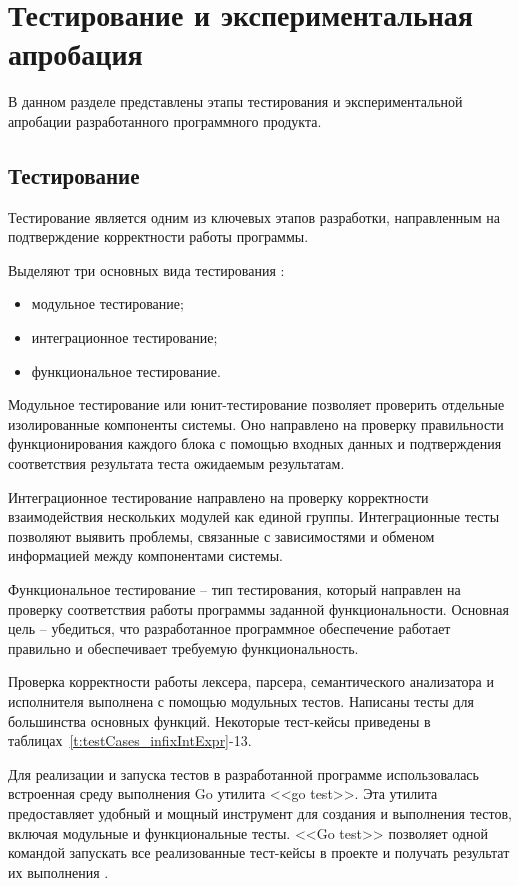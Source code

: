 \section{Тестирование и экспериментальная апробация}

В данном разделе представлены этапы тестирования и экспериментальной апробации разработанного программного продукта.

\subsection{Тестирование}

Тестирование является одним из ключевых этапов разработки, направленным на подтверждение корректности работы программы.

Выделяют три основных вида тестирования :
\begin{itemize}
    \item модульное тестирование;
    \item интеграционное тестирование;
    \item функциональное тестирование.
\end{itemize}

Модульное тестирование или юнит-тестирование позволяет проверить отдельные изолированные компоненты системы.
Оно направлено на проверку правильности функционирования каждого блока с помощью входных данных и подтверждения соответствия результата теста ожидаемым результатам.

Интеграционное тестирование направлено на проверку корректности взаимодействия нескольких модулей как единой группы.
Интеграционные тесты позволяют выявить проблемы, связанные с зависимостями и обменом информацией между компонентами системы.

Функциональное тестирование -- тип тестирования, который направлен на проверку соответствия работы программы заданной функциональности.
Основная цель -- убедиться, что разработанное программное обеспечение работает правильно и обеспечивает требуемую функциональность.

Проверка корректности работы лексера, парсера, семантического анализатора и исполнителя выполнена с помощью модульных тестов.
Написаны тесты для большинства основных функций.
Некоторые тест-кейсы приведены в таблицах~\ref{t:testCases_infixIntExpr}-13.

Для реализации и запуска тестов в разработанной программе использовалась встроенная среду выполнения Go утилита <<go test>>.
Эта утилита предоставляет удобный и мощный инструмент для создания и выполнения тестов, включая модульные и функциональные тесты.
<<Go test>> позволяет одной командой запускать все реализованные тест-кейсы в проекте и получать результат их выполнения .

